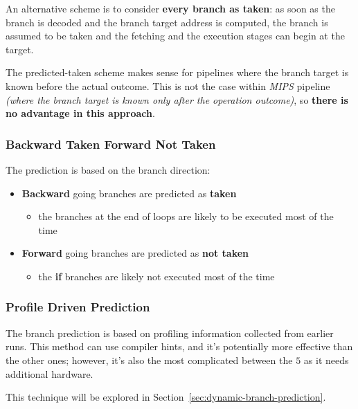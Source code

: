 \documentclass[english]{article}
\begin{document}
An alternative scheme is to consider \textbf{every branch as taken}: as soon as the branch is decoded and the branch target address is computed, the branch is assumed to be taken and the fetching and the execution stages can begin at the target.

The predicted-taken scheme makes sense for pipelines where the branch target is known before the actual outcome.
This is not the case within \textit{MIPS} pipeline \textit{(where the branch target is known only after the operation outcome)}, so \textbf{there is no advantage in this approach}.

\subsubsection{Backward Taken Forward Not Taken}
\label{sec:backward-taken-forward-not-taken}

The prediction is based on the branch direction:

\begin{itemize}
  \item \textbf{Backward} going branches are predicted as \textbf{taken}
        \begin{itemize}
          \item the branches at the end of loops are likely to be executed most of the time
        \end{itemize}
  \item \textbf{Forward} going branches are predicted as \textbf{not taken}
        \begin{itemize}
          \item the \textbf{if} branches are likely not executed most of the time
        \end{itemize}
\end{itemize}

\subsubsection{Profile Driven Prediction}
\label{sec:profile-driven-prediction}

The branch prediction is based on profiling information collected from earlier runs.
This method can use compiler hints, and it's potentially more effective than the other ones;
however, it's also the most complicated between the \(5\) as it needs additional hardware.

This technique will be explored in Section~\ref{sec:dynamic-branch-prediction}.
\end{document}
